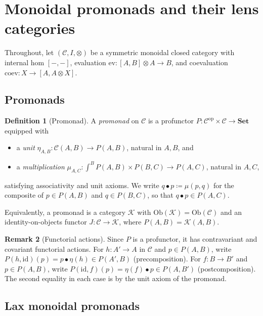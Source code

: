 \documentclass[11pt]{article}
\theoremstyle{definition}
\newtheorem{definition}{Definition}[section]
\newtheorem{remark}[definition]{Remark}
\newcommand{\id}{\mathrm{id}}
\newcommand{\cat}[1]{\mathcal{#1}}
\newcommand{\Cat}[1]{\mathbf{#1}}
\newcommand{\op}{^{\mathrm{op}}}
\newcommand{\ev}{\mathrm{ev}}
\newcommand{\coev}{\mathrm{coev}}
\newcommand{\ihom}[2]{[#1,#2]}
\newcommand{\smset}{\Cat{Set}}
\begin{document}
\section{Monoidal promonads and their lens categories}\label{sec.promonad_theta}

Throughout, let $(\cat{C},I,\otimes)$ be a symmetric monoidal closed category with internal hom $\ihom{-}{-}$, evaluation $\ev\colon\ihom{A}{B}\otimes A\to B$, and coevaluation $\coev\colon X\to\ihom{A}{A\otimes X}$.

\subsection{Promonads}

\begin{definition}[Promonad]\label{def.promonad}
A \emph{promonad} on $\cat{C}$ is a profunctor $P\colon\cat{C}\op\times\cat{C}\to\smset$ equipped with
\begin{itemize}
\item a \emph{unit} $\eta_{A,B}\colon\cat{C}(A,B)\to P(A,B)$, natural in $A,B$, and
\item a \emph{multiplication} $\mu_{A,C}\colon\int^{B}P(A,B)\times P(B,C)\to P(A,C)$, natural in $A,C$,
\end{itemize}
satisfying associativity and unit axioms. We write $q\bullet p\coloneqq\mu(p,q)$ for the composite of $p\in P(A,B)$ and $q\in P(B,C)$, so that $q\bullet p\in P(A,C)$.

Equivalently, a promonad is a category $\cat{K}$ with $\mathrm{Ob}(\cat{K})=\mathrm{Ob}(\cat{C})$ and an identity-on-objects functor $J\colon\cat{C}\to\cat{K}$, where $P(A,B)=\cat{K}(A,B)$.
\end{definition}

\begin{remark}[Functorial actions]\label{rmk.functorial}
Since $P$ is a profunctor, it has contravariant and covariant functorial actions. For $h\colon A'\to A$ in $\cat{C}$ and $p\in P(A,B)$, write $P(h,\id)(p)=p\bullet\eta(h)\in P(A',B)$ (precomposition). For $f\colon B\to B'$ and $p\in P(A,B)$, write $P(\id,f)(p)=\eta(f)\bullet p\in P(A,B')$ (postcomposition). The second equality in each case is by the unit axiom of the promonad.
\end{remark}

\subsection{Lax monoidal promonads}
\end{document}
